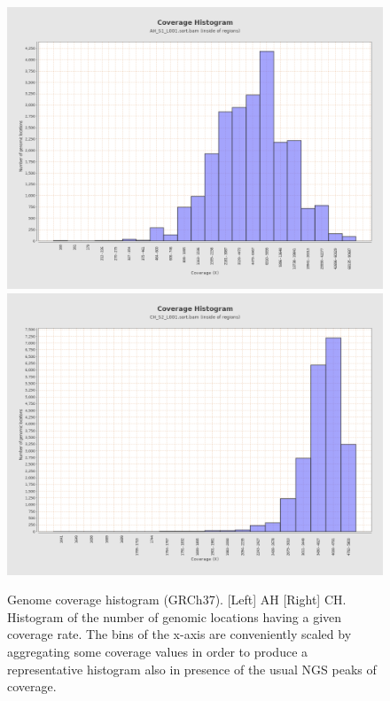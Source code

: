 \documentclass{article}
\begin{document}
\begin{figure}[ht] \hspace*{0cm} 
\begin{center}
    \includegraphics[scale=0.12]{qualimap/AH_S1_L001.sort_stats/images_qualimapReport/genome_coverage_histogram}
        \includegraphics[scale=0.12]{qualimap/CH_S2_L001.sort_stats/images_qualimapReport/genome_coverage_histogram}
	\caption{
	Genome coverage histogram (GRCh37). [Left] AH [Right] CH.
	Histogram of the number of genomic locations having a given coverage rate. The bins of the x-axis are conveniently scaled by aggregating some coverage values in order to produce a representative histogram also in presence of the usual NGS peaks of coverage.
	}
	\label{fig:qualimap_gen_cov_hist}
\end{center}
\end{figure}
\end{document}
